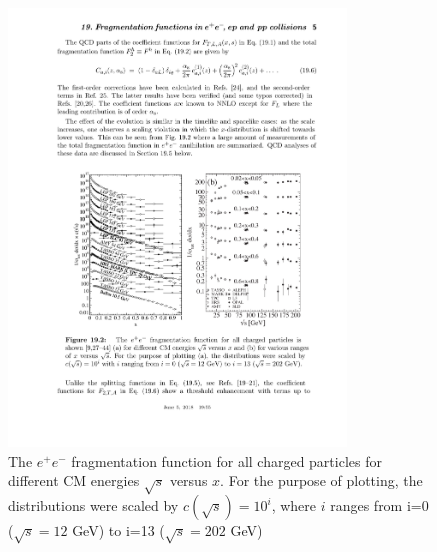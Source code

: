   \begin{figure}[htpb]
    \centering
    \includegraphics[width=0.8\textwidth]{Introduction/pdg_ff.pdf}
    \caption{The $e^+e^-$ fragmentation function for all charged particles for different CM energies  $ \sqrt{s} $ versus $x$. For the purpose of plotting, the distributions were scaled by  $c(\sqrt{s}) = 10^i$, where $i$ ranges from i=0 ($\sqrt{s}=12$ GeV) to i=13 ($\sqrt{s} = 202 $ GeV) \cite{deFlorian2018}} 
    \label{fig:pdg_ff}
  \end{figure}
  
